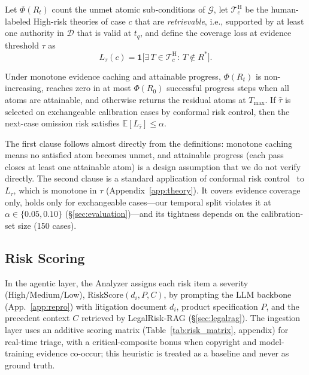 Let $\Phi(R_t)$ count the unmet atomic sub-conditions of $\mathcal{G}$, let $\mathcal{T}^{\text{H}}_c$ be the human-labeled High-risk theories of case $c$ that are \emph{retrievable}, i.e., supported by at least one authority in $\mathcal{D}$ that is valid at $t_q$, and define the coverage loss at evidence threshold $\tau$ as
\begin{equation}
  L_\tau(c)=\mathbf{1}\bigl[\exists\,T\in\mathcal{T}^{\text{H}}_c:\ T\notin R^*\bigr].
\end{equation}
\begin{proposition}
\label{prop:termination}
Under monotone evidence caching and attainable progress, $\Phi(R_t)$ is non-increasing, reaches zero in at most $\Phi(R_0)$ successful progress steps when all atoms are attainable, and otherwise returns the residual atoms at $T_{\max}$. If $\hat\tau$ is selected on exchangeable calibration cases by conformal risk control, then the next-case omission risk satisfies $\mathbb{E}[L_{\hat\tau}]\le\alpha$.
\end{proposition}
The first clause follows almost directly from the definitions: monotone caching means no satisfied atom becomes unmet, and attainable progress (each pass closes at least one attainable atom) is a design assumption that we do not verify directly. The second clause is a standard application of conformal risk control~\citep{angelopoulos2023conformalrisk} to $L_\tau$, which is monotone in $\tau$ (Appendix~\ref{app:theory}). It covers evidence coverage only, holds only for exchangeable cases---our temporal split violates it at $\alpha\in\{0.05,0.10\}$ (\S\ref{sec:evaluation})---and its tightness depends on the calibration-set size (150 cases).

\subsection{Risk Scoring}

In the agentic layer, the Analyzer assigns each risk item a severity (High/Medium/Low), $\text{RiskScore}(d_i,P,C)$, by prompting the LLM backbone (App.~\ref{app:repro}) with litigation document $d_i$, product specification $P$, and the precedent context $C$ retrieved by LegalRisk-RAG (\S\ref{sec:legalrag}). The ingestion layer uses an additive scoring matrix (Table~\ref{tab:risk_matrix}, appendix) for real-time triage, with a critical-composite bonus when copyright and model-training evidence co-occur; this heuristic is treated as a baseline and never as ground truth.
